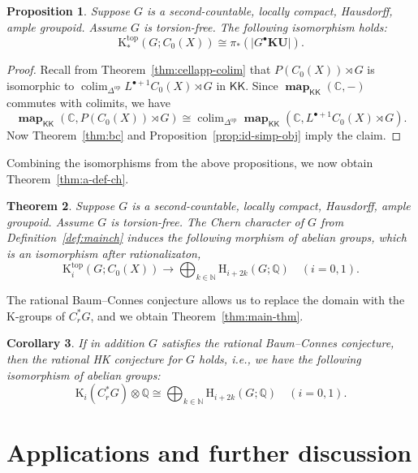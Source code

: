 \documentclass[a4paper,reqno]{amsart}
\theoremstyle{plain}
\newtheorem{theorem}{Theorem}[section]
\newtheorem{proposition}[theorem]{Proposition}
\newtheorem{corollary}[theorem]{Corollary}
\theoremstyle{definition}
\theoremstyle{remark}
\numberwithin{equation}{section}
\newcommand{\rH}{\mathrm{H}}
\newcommand{\rK}{\mathrm{K}}
\newcommand{\dC}{\mathbb{C}}
\newcommand{\dN}{\mathbb{N}}
\newcommand{\dQ}{\mathbb{Q}}
\newcommand{\icKK}{\mathsf{KK}}
\newcommand{\gr}[1]{\lvert #1\rvert}
\newcommand{\KU}{\mathbf{KU}}
\DeclareMathOperator{\map}{\mathbf{map}}
\DeclareMathOperator*{\colim}{colim}
\begin{document}
\begin{proposition}%
Suppose $G$ is a second-countable, locally compact, Hausdorff, ample groupoid. Assume $G$ is torsion-free. The following isomorphism holds:
\[
\rK_*^{\mathrm{top}}(G; C_0(X))\cong  \pi_*(\gr{G^{\bullet}\KU}).
\]
\end{proposition}
\begin{proof}
Recall from Theorem~\ref{thm:cellapp-colim} that $P(C_0(X))\rtimes G$ is isomorphic to $\colim_{\Delta^{\mathrm{op}}} {L^{\bullet+1} C_0(X)\rtimes G}$ in $\icKK$.
Since $\map_{\icKK}(\dC,-)$ commutes with colimits, we have
\[
\map_{\icKK}(\dC,P(C_0(X))\rtimes G)\cong \colim_{\Delta^{\mathrm{op}}}\map_{\icKK}(\dC,L^{\bullet+1} C_0(X)\rtimes G).
\]
Now Theorem~\ref{thm:bc} and Proposition~\ref{prop:id-simp-obj} imply the claim.
\end{proof}

Combining the isomorphisms from the above propositions, we now obtain Theorem~\ref{thm:a-def-ch}.

\begin{theorem}\label{thm:ch-ab}
Suppose $G$ is a second-countable, locally compact, Hausdorff, ample groupoid. Assume $G$ is torsion-free.
The Chern character of $G$ from Definition~\ref{def:mainch} induces the following morphism of abelian groups, which is an isomorphism after rationalizaton,
\begin{equation*}%
\rK_i^{\mathrm{top}}(G; C_0(X)) \to \bigoplus_{k\in \dN} \rH_{i+2k}(G; \dQ) \quad (i = 0, 1).
\end{equation*}
\end{theorem}

The rational Baum--Connes conjecture allows us to replace the domain with the K-groups of $C^*_r G$, and we obtain Theorem~\ref{thm:main-thm}.

\begin{corollary}\label{cor:hk-iso}
If in addition $G$ satisfies the rational Baum--Connes conjecture, then the rational HK conjecture for $G$ holds, i.e., we have the following isomorphism of abelian groups:
\begin{equation*}%
\rK_i(C^*_r G)\otimes \dQ \cong \bigoplus_{k\in \dN} \rH_{i+2k}(G; \dQ) \quad (i = 0, 1).
\end{equation*}
\end{corollary}

\section{Applications and further discussion}\label{sec:appl}
\end{document}

